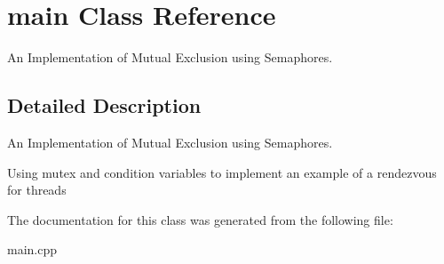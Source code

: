 \hypertarget{classmain}{}\section{main Class Reference}
\label{classmain}


An Implementation of Mutual Exclusion using Semaphores.  




\subsection{Detailed Description}
An Implementation of Mutual Exclusion using Semaphores. 

Using mutex and condition variables to implement an example of a rendezvous for threads 

The documentation for this class was generated from the following file\+:\begin{DoxyCompactItemize}
\item 
main.\+cpp\end{DoxyCompactItemize}
